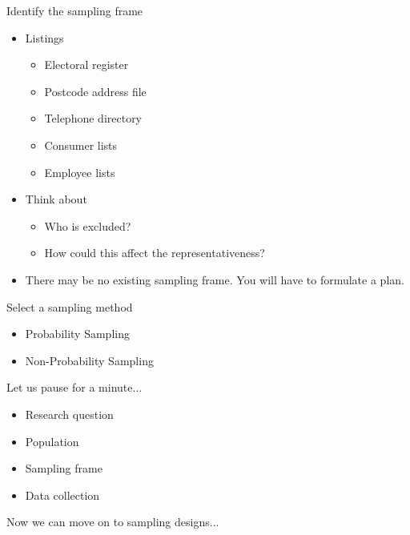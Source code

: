 \documentclass[10pt, compress]{beamer}
\begin{document}
\begin{frame}[t]{Identify the sampling frame}
    \begin{itemize}
        \item Listings
        \begin{itemize}
            \item Electoral register
            \item Postcode address file
            \item Telephone directory
            \item Consumer lists
            \item Employee lists
        \end{itemize}
        \item Think about
        \begin{itemize}
            \item Who is excluded?
            \item How could this affect the representativeness?
        \end{itemize}
        \item There may be no existing sampling frame. You will have to formulate a plan.
    \end{itemize}
\end{frame}

\begin{frame}[t]{Select a sampling method}
    \begin{itemize}
        \item Probability Sampling
        \item Non-Probability Sampling
    \end{itemize}
\end{frame}

\begin{frame}[t]{Let us pause for a minute...}
    \begin{itemize}
        \item Research question
        \item Population
        \item Sampling frame
        \item Data collection
    \end{itemize}
    \bigskip
    Now we can move on to sampling designs...
\end{frame}
\end{document}
